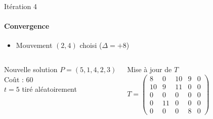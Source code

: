 \documentclass{beamer}
\begin{document}
\begin{frame}{Itération 4}
    \framesubtitle{Convergence}


    \begin{itemize}
        \item Mouvement \( (2,4) \) choisi (\( \Delta = +8 \))
    \end{itemize}

    \begin{columns}
        \begin{alertblock}{Nouvelle solution}
            \( P = (5, 1, 4, 2, 3) \) \\
            Coût : 60 \\
            \( t = 5 \) tiré aléatoirement
        \end{alertblock}

        \begin{exampleblock}{Mise à jour de \( T \)}
            \[
                T = \begin{pmatrix}
                    8  & 0  & 10 & 9 & 0 \\
                    10 & 9  & 11 & 0 & 0 \\
                    0  & 0  & 0  & 0 & 0 \\
                    0  & 11 & 0  & 0 & 0 \\
                    0  & 0  & 0  & 8 & 0
                \end{pmatrix}
            \]
        \end{exampleblock}
    \end{columns}
\end{frame}
\end{document}
